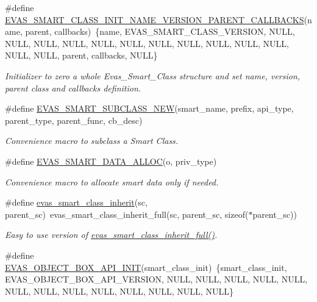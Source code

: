 \begin{DoxyCompactItemize}
\#define \hyperlink{group__Evas__Smart__Group_ga5ebe1775142621cc3b75a3c57085ec83}{EVAS\_\-SMART\_\-CLASS\_\-INIT\_\-NAME\_\-VERSION\_\-PARENT\_\-CALLBACKS}(name, parent, callbacks)~\{name, EVAS\_\-SMART\_\-CLASS\_\-VERSION, NULL, NULL, NULL, NULL, NULL, NULL, NULL, NULL, NULL, NULL, NULL, NULL, NULL, parent, callbacks, NULL\}
\begin{DoxyCompactList}\small\item\em Initializer to zero a whole Evas\_\-Smart\_\-Class structure and set name, version, parent class and callbacks definition. \item\end{DoxyCompactList}\item 
\#define \hyperlink{group__Evas__Smart__Group_ga58dc94af6f064b39b2bf0155908fbe52}{EVAS\_\-SMART\_\-SUBCLASS\_\-NEW}(smart\_\-name, prefix, api\_\-type, parent\_\-type, parent\_\-func, cb\_\-desc)
\begin{DoxyCompactList}\small\item\em Convenience macro to subclass a Smart Class. \item\end{DoxyCompactList}\item 
\#define \hyperlink{group__Evas__Smart__Group_ga4aa4b72aafa0391144fb0171aeff2ccd}{EVAS\_\-SMART\_\-DATA\_\-ALLOC}(o, priv\_\-type)
\begin{DoxyCompactList}\small\item\em Convenience macro to allocate smart data only if needed. \item\end{DoxyCompactList}\item 
\#define \hyperlink{group__Evas__Smart__Group_ga6888875280ccf11f026e09c890650c95}{evas\_\-smart\_\-class\_\-inherit}(sc, parent\_\-sc)~evas\_\-smart\_\-class\_\-inherit\_\-full(sc, parent\_\-sc, sizeof($\ast$parent\_\-sc))
\begin{DoxyCompactList}\small\item\em Easy to use version of \hyperlink{group__Evas__Smart__Group_ga21f5af32f724500c3380906d166fc49f}{evas\_\-smart\_\-class\_\-inherit\_\-full()}. \item\end{DoxyCompactList}\item 
\#define \hyperlink{group__Evas__Object__Box_ga118b1b5bc278185207e7651911637ac8}{EVAS\_\-OBJECT\_\-BOX\_\-API\_\-INIT}(smart\_\-class\_\-init)~\{smart\_\-class\_\-init, EVAS\_\-OBJECT\_\-BOX\_\-API\_\-VERSION, NULL, NULL, NULL, NULL, NULL, NULL, NULL, NULL, NULL, NULL, NULL, NULL, NULL\}

\end{DoxyCompactItemize}
